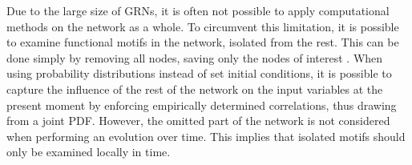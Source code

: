 \documentclass[../main.tex]{subfiles}
\begin{document}
Due to the large size of GRNs, it is often not possible to apply computational methods on the network as a whole.
To circumvent this limitation, it is possible to examine functional motifs in the network, isolated from the rest.
This can be done simply by removing all nodes, saving only the nodes of interest \cite{zhang2012chaotic}.
When using probability distributions instead of set initial conditions, it is possible to capture the influence of the rest of the network on the input variables at the present moment by enforcing empirically determined correlations, thus drawing from a joint PDF.
However, the omitted part of the network is not considered when performing an evolution over time.
This implies that isolated motifs should only be examined locally in time. %
\end{document}
